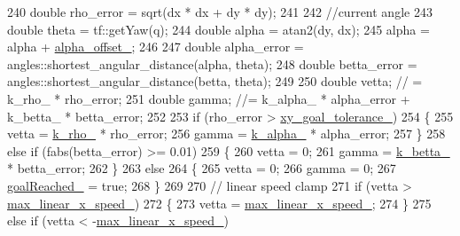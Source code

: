 \begin{DoxyCode}
{240     \textcolor{keywordtype}{double} rho\_error = sqrt(dx * dx + dy * dy);
241 
242     \textcolor{comment}{//current angle}
243     \textcolor{keywordtype}{double} theta = tf::getYaw(q);
244     \textcolor{keywordtype}{double} alpha = atan2(dy, dx);
245     alpha = alpha + \hyperlink{classmove__base__z__client_1_1forward__local__planner_1_1ForwardLocalPlanner_a358adfdd02866b413518dee9d5212b8f}{alpha\_offset\_};
246 
247     \textcolor{keywordtype}{double} alpha\_error = angles::shortest\_angular\_distance(alpha, theta);
248     \textcolor{keywordtype}{double} betta\_error = angles::shortest\_angular\_distance(betta, theta);
249 
250     \textcolor{keywordtype}{double} vetta; \textcolor{comment}{// = k\_rho\_ * rho\_error;}
251     \textcolor{keywordtype}{double} gamma; \textcolor{comment}{//= k\_alpha\_ * alpha\_error + k\_betta\_ * betta\_error;}
252 
253     \textcolor{keywordflow}{if} (rho\_error > \hyperlink{classmove__base__z__client_1_1forward__local__planner_1_1ForwardLocalPlanner_a462f6c9011e538965326add2dfb7529d}{xy\_goal\_tolerance\_})
254     \{
255         vetta = \hyperlink{classmove__base__z__client_1_1forward__local__planner_1_1ForwardLocalPlanner_a1b54015059a753c82b1856dc289c1c15}{k\_rho\_} * rho\_error;
256         gamma = \hyperlink{classmove__base__z__client_1_1forward__local__planner_1_1ForwardLocalPlanner_a850d27109bd2036abb7ab0a25a4f7f84}{k\_alpha\_} * alpha\_error;
257     \}
258     \textcolor{keywordflow}{else} \textcolor{keywordflow}{if} (fabs(betta\_error) >= 0.01)
259     \{
260         vetta = 0;
261         gamma = \hyperlink{classmove__base__z__client_1_1forward__local__planner_1_1ForwardLocalPlanner_a3f5712d51ff58633cbffe40cb5608b72}{k\_betta\_} * betta\_error;
262     \}
263     \textcolor{keywordflow}{else}
264     \{
265         vetta = 0;
266         gamma = 0;
267         \hyperlink{classmove__base__z__client_1_1forward__local__planner_1_1ForwardLocalPlanner_a2c86f8381cc3b8677f95f32ae6939023}{goalReached\_} = \textcolor{keyword}{true};
268     \}
269 
270     \textcolor{comment}{// linear speed clamp}
271     \textcolor{keywordflow}{if} (vetta > \hyperlink{classmove__base__z__client_1_1forward__local__planner_1_1ForwardLocalPlanner_ad08d97c8679f1da4455de4e03e1861ae}{max\_linear\_x\_speed\_})
272     \{
273         vetta = \hyperlink{classmove__base__z__client_1_1forward__local__planner_1_1ForwardLocalPlanner_ad08d97c8679f1da4455de4e03e1861ae}{max\_linear\_x\_speed\_};
274     \}
275     \textcolor{keywordflow}{else} \textcolor{keywordflow}{if} (vetta < -\hyperlink{classmove__base__z__client_1_1forward__local__planner_1_1ForwardLocalPlanner_ad08d97c8679f1da4455de4e03e1861ae}{max\_linear\_x\_speed\_})
}
\end{DoxyCode}
